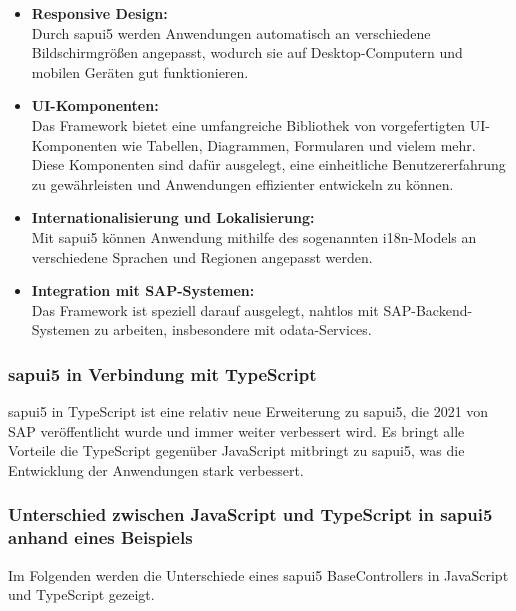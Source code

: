 \begin{itemize}
    \item \textbf{Responsive Design:} \\
    Durch \gls{sapui5} werden Anwendungen automatisch an verschiedene Bildschirmgrößen angepasst, wodurch sie auf Desktop-Computern und mobilen Geräten gut funktionieren.
    \item \textbf{UI-Komponenten:} \\
    Das Framework bietet eine umfangreiche Bibliothek von vorgefertigten UI-Komponenten wie Tabellen, Diagrammen, Formularen und vielem mehr.
    Diese Komponenten sind dafür ausgelegt, eine einheitliche Benutzererfahrung zu gewährleisten und Anwendungen effizienter entwickeln zu können.
    \item \textbf{Internationalisierung und Lokalisierung:} \\
    Mit \gls{sapui5} können Anwendung mithilfe des sogenannten i18n-Models an verschiedene Sprachen und Regionen angepasst werden. 
    \item \textbf{Integration mit SAP-Systemen:} \\
    Das Framework ist speziell darauf ausgelegt, nahtlos mit SAP-Backend-Systemen zu arbeiten, insbesondere mit \gls{odata}-Services.
\end{itemize}

\subsubsection[\gls{sapui5} in Verbindung mit TypeScript]{\gls{sapui5} in Verbindung mit TypeScript}
\gls{sapui5} in TypeScript ist eine relativ neue Erweiterung zu \gls{sapui5}, die 2021 von SAP veröffentlicht wurde und immer weiter verbessert wird.
Es bringt alle Vorteile die TypeScript gegenüber JavaScript mitbringt zu \gls{sapui5}, was die Entwicklung der Anwendungen stark verbessert.

\subsubsection[Unterschied zwischen JavaScript und TypeScript in \gls{sapui5} anhand eines Beispiels]{Unterschied zwischen JavaScript und TypeScript in \gls{sapui5} anhand eines Beispiels}
Im Folgenden werden die Unterschiede eines \gls{sapui5} BaseControllers in JavaScript und TypeScript gezeigt. 


